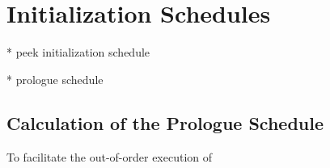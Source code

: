 \section{Initialization Schedules}

* peek initialization schedule

* prologue schedule

\subsection{Calculation of the Prologue Schedule}

To facilitate the out-of-order execution of 